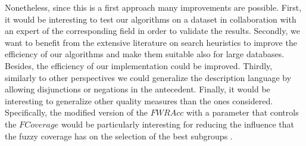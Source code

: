Nonetheless, since this is a first approach many improvements are possible. First, it would be interesting to test our algorithms on a dataset in collaboration with an expert of the corresponding field in order to validate the results. Secondly, we want to benefit from the extensive literature on search heuristics to improve the efficiency of our algorithms and make them suitable also for large databases. Besides, the efficiency of our implementation could be improved. Thirdly, similarly to other perspectives we could generalize the description language by allowing disjunctions or negations in the antecedent. Finally, it would be interesting to generalize other quality measures than the ones considered. Specifically, the modified version of the $FWRAcc$ with a parameter that controls the $FCoverage$ would be particularly interesting for reducing the influence that the fuzzy coverage has on the selection of the best subgroups \cite{Atzmueller2015}.